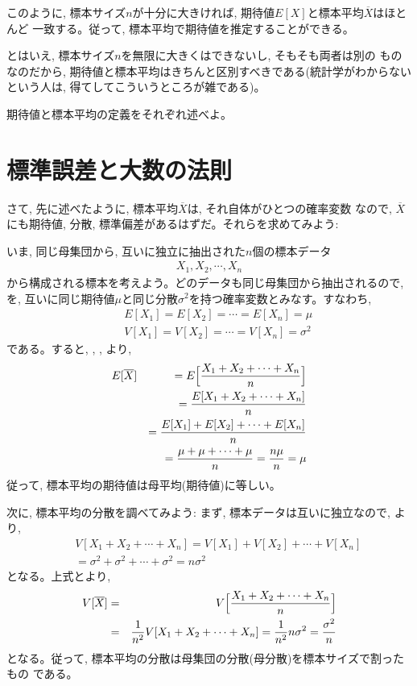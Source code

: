 このように, 標本サイズ$n$が十分に大きければ, 期待値$E[X]$と標本平均$\overline{X}$はほとんど
一致する。従って, 標本平均で期待値を推定することができる。

とはいえ, 標本サイズ$n$を無限に大きくはできないし, そもそも両者は別の
ものなのだから, 期待値と標本平均はきちんと区別すべきである(統計学がわからないという人は, 
得てしてこういうところが雑である)。

\begin{q}\label{q:stat_expect_average_def} 期待値と標本平均の定義をそれぞれ述べよ。\end{q}
\vv

\section{標準誤差と大数の法則}
さて, 先に述べたように, 標本平均$\overline{X}$は, それ自体がひとつの確率変数
なので, $\overline{X}$にも期待値, 分散, 標準偏差があるはずだ。それらを求めてみよう:

いま, 同じ母集団から, 互いに独立に抽出された$n$個の標本データ
\begin{eqnarray}X_1, X_2, \cdots, X_n\label{eq:sample_data_n}\end{eqnarray}
から構成される標本を考えよう。どのデータも同じ母集団から抽出されるので, 
を, 互いに同じ期待値$\mu$と同じ分散$\sigma^2$を持つ確率変数とみなす。すなわち, 
\begin{eqnarray}
&&E[X_1]=E[X_2]=\cdots=E[X_n]=\mu\\
&&V[X_1]=V[X_2]=\cdots=V[X_n]=\sigma^2
\end{eqnarray}
である。すると, , , より, 
\begin{eqnarray}
E[\overline{X}]&&=E\Bigl[\frac{X_1+X_2+\cdots+X_n}{n}\Bigr]\nonumber\\
&&=\frac{E[X_1+X_2+\cdots+X_n]}{n}\nonumber\\
&&=\frac{E[X_1]+E[X_2]+\cdots+E[X_n]}{n}\nonumber\\
&&=\frac{\mu+\mu+\cdots+\mu}{n}=\frac{n\mu}{n}=\mu
\end{eqnarray}
従って, 標本平均の期待値は母平均(期待値)に等しい。

次に, 標本平均の分散を調べてみよう: まず, 標本データは互いに独立なので, より, 
\begin{eqnarray}
&&V[X_1+X_2+\cdots+X_n]
=V[X_1]+V[X_2]+\cdots+V[X_n]\nonumber\\
&&=\sigma^2+\sigma^2+\cdots+\sigma^2=n\sigma^2
\end{eqnarray}
となる。上式とより, 
\begin{eqnarray}
V[\overline{X}]&=&V\Bigl[\frac{X_1+X_2+\cdots+X_n}{n}\Bigr]\nonumber\\
                &=&\frac{1}{n^2}V[X_1+X_2+\cdots+X_n]=\frac{1}{n^2}n\sigma^2=\frac{\sigma^2}{n}\nonumber\\\label{eq:var_averageX}
\end{eqnarray}
となる。従って, 標本平均の分散は母集団の分散(母分散)を標本サイズで割ったもの
である。

